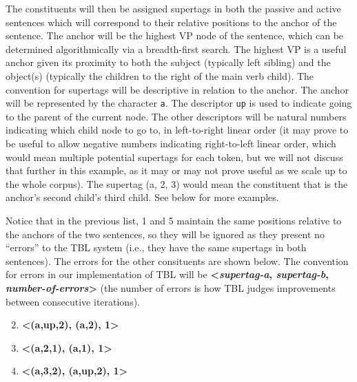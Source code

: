 \documentclass{article}
\begin{document}
The constituents will then be assigned supertags in both the passive and active sentences which will correspond to their relative positions to the anchor of the sentence. The anchor will be the highest VP node of the sentence, which can be determined algorithmically via a breadth-first search. The highest VP is a useful anchor given its proximity to both the subject (typically left sibling) and the object(s) (typically the children to the right of the main verb child). The convention for supertags will be descriptive in relation to the anchor. The anchor will be represented by the character \texttt{a}. The descriptor \texttt{up} is used to indicate going to the parent of the current node. The other descriptors will be natural numbers indicating which child node to go to, in left-to-right linear order (it may prove to be useful to allow negative numbers indicating right-to-left linear order, which would mean multiple potential supertags for each token, but we will not discuss that further in this example, as it may or may not prove useful as we scale up to the whole corpus). The supertag (a, 2, 3) would mean the constituent that is the anchor's second child's third child. See below for more examples.	

Notice that in the previous list, 1 and 5 maintain the same positions relative to the anchors of the two sentences, so they will be ignored as they present no ``errors'' to the TBL system (i.e., they have the same supertags in both sentences). The errors for the other consituents are shown below. The convention for errors in our implementation of TBL will be \textbf{\textless\textit{supertag-a}, \textit{supertag-b}, \textit{number-of-errors}\textgreater} (the number of errors is how TBL judges improvements between consecutive iterations).

\begin{enumerate}
\setcounter{enumi}{1}
\item \textbf{\textless(a,up,2), (a,2), 1\textgreater}
\item \textbf{\textless(a,2,1), (a,1), 1\textgreater}
\item \textbf{\textless(a,3,2), (a,up,2), 1\textgreater}
\end{enumerate}


\end{document}
